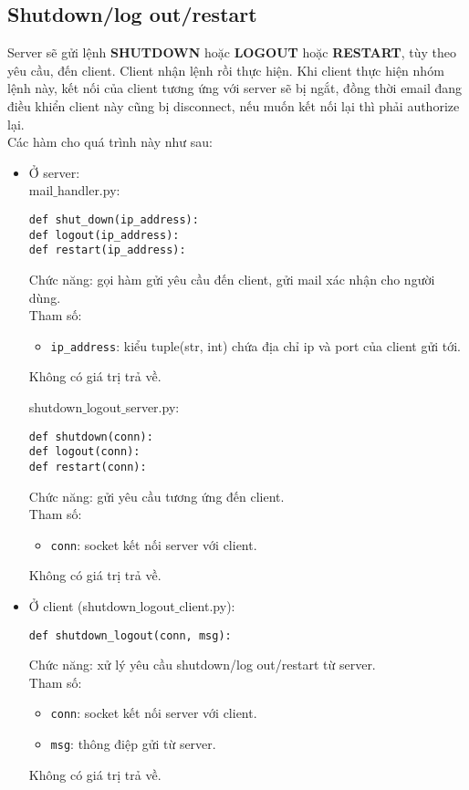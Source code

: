 \subsection{Shutdown/log out/restart}
Server sẽ gửi lệnh \textbf{SHUTDOWN} hoặc \textbf{LOGOUT} hoặc \textbf{RESTART}, tùy theo yêu cầu, đến client. Client nhận lệnh rồi thực hiện. Khi client thực hiện nhóm lệnh này, kết nối của client tương ứng với server sẽ bị ngắt, đồng thời email đang điều khiển client này cũng bị disconnect, nếu muốn kết nối lại thì phải authorize lại.\\
Các hàm cho quá trình này như sau:
\begin{itemize}
\item Ở server:\\
mail$\_$handler.py:
\begin{lstlisting}
def shut_down(ip_address):
def logout(ip_address):
def restart(ip_address):
\end{lstlisting}
Chức năng: gọi hàm gửi yêu cầu đến client, gửi mail xác nhận cho người dùng.\\
Tham số: 
\begin{itemize}
\item \lstinline{ip_address}: kiểu tuple(str, int) chứa địa chỉ ip và port của client gửi tới.
\end{itemize}
Không có giá trị trả về.

shutdown$\_$logout$\_$server.py:
\begin{lstlisting}
def shutdown(conn):
def logout(conn):
def restart(conn):
\end{lstlisting}
Chức năng: gửi yêu cầu tương ứng đến client.\\
Tham số: 
\begin{itemize}
\item \lstinline{conn}: socket kết nối server với client.
\end{itemize}
Không có giá trị trả về.
\item Ở client (shutdown$\_$logout$\_$client.py):
\begin{lstlisting}
def shutdown_logout(conn, msg):
\end{lstlisting}
Chức năng: xử lý yêu cầu shutdown/log out/restart từ server.\\
Tham số: 
\begin{itemize}
\item \lstinline{conn}: socket kết nối server với client.
\item \lstinline{msg}: thông điệp gửi từ server.
\end{itemize}
Không có giá trị trả về. 
\end{itemize}


